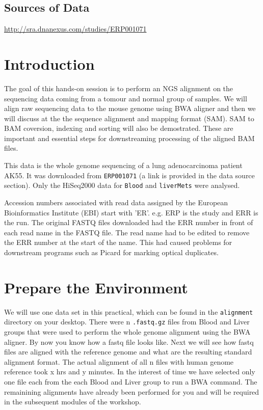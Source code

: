\subsection{Sources of Data}
  \url{http://sra.dnanexus.com/studies/ERP001071}

\clearpage

\section{Introduction}

\begin{information}
The goal of this hands-on session is to perform an NGS alignment on the sequencing data coming from a tomour and normal group of samples. We will align raw sequencing data to the mouse genome using BWA aligner and then we will discuss at the the sequence alignment and mapping format (SAM). SAM to BAM coversion, indexing and sorting will also be demostrated. These are important and essential steps for downstreaming processing of the aligned BAM files. 
 
This data is the whole genome sequencing of a lung adenocarcinoma patient AK55. It was downloaded from \texttt{ERP001071} (a link is provided in the data source section). Only the HiSeq2000 data for \texttt{Blood} and \texttt{liverMets} were analysed.

Accession numbers associated with read data assigned by the European Bioinformatics Institute (EBI) start with 'ER'. e.g. ERP is the study and ERR is the run. The original FASTQ files downloaded had the ERR number in front of each read name in the FASTQ file. The read name had to be edited to remove the ERR number at the start of the name. This had caused problems for downstream programs such as Picard for marking optical duplicates.

\end{information}

\section{Prepare the Environment}

\begin{information}
We will use one data set in this practical, which can be found in the \texttt{alignment}
directory on your desktop.
There were n \texttt{.fastq.gz} files from Blood and Liver groups that were used to perform the whole genome alignment using the BWA aligner. By now you know how a fastq file looks like. Next we will see how fastq files are aligned with the reference genome and what are the resulting standard alignment format. The actual alignment of all n files with human genome reference took x hrs and y minutes. In the interest of time we have selected only one file each from the each Blood and Liver group to run a BWA command. The remainining alignments have already been performed for you and will be required in the subsequent modules of the workshop.
\end{information}

